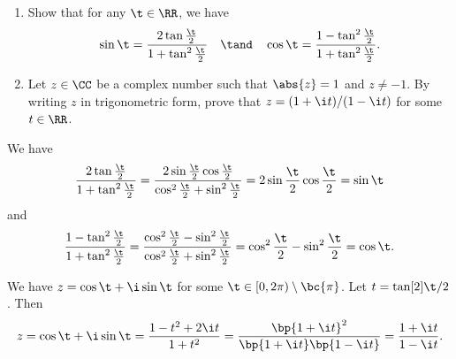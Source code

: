 \begin{problem}
    \begin{enumerate}
        \item Show that for any $\t \in \RR$, we have \[\sin \t = \frac{2\tan \frac\t2}{1 + \tan^2 \frac\t2} \quad \tand \quad \cos \t = \frac{1 - \tan^2 \frac\t2}{1 + \tan^2 \frac\t2}.\]
        \item Let $z \in \CC$ be a complex number such that $\abs{z} = 1$ and $z \neq -1$. By writing $z$ in trigonometric form, prove that $z = (1+\i t)/(1 - \i t)$ for some $t \in \RR$.
    \end{enumerate}
\end{problem}
\begin{solution}
    \begin{ppart}
        We have \[\frac{2\tan \frac\t2}{1 + \tan^2 \frac\t2} = \frac{2\sin \frac\t2 \cos \frac\t2}{\cos^2 \frac\t2 + \sin^2 \frac\t2} = 2\sin\frac\t2\cos\frac\t2 = \sin \t\] and \[\frac{1 - \tan^2 \frac\t2}{1 + \tan^2 \frac\t2} = \frac{\cos^2 \frac\t2 - \sin^2 \frac\t2}{\cos^2 \frac\t2 + \sin^2 \frac\t2} = \cos^2 \frac\t2 - \sin^2 \frac\t2 = \cos \t.\]
    \end{ppart}
    \begin{ppart}
        We have $z = \cos \t + \i \sin \t$ for some $\t \in [0, 2\pi) \setminus \bc{\pi}$. Let $t = \tan[2]{\t/2}$. Then \[z = \cos \t + \i \sin \t = \frac{1 - t^2 + 2\i t}{1 + t^2} = \frac{\bp{1 + \i t}^2}{\bp{1 + \i t}\bp{1 - \i t}} = \frac{1 + \i t}{1 - \i t}.\]
    \end{ppart}
\end{solution}

